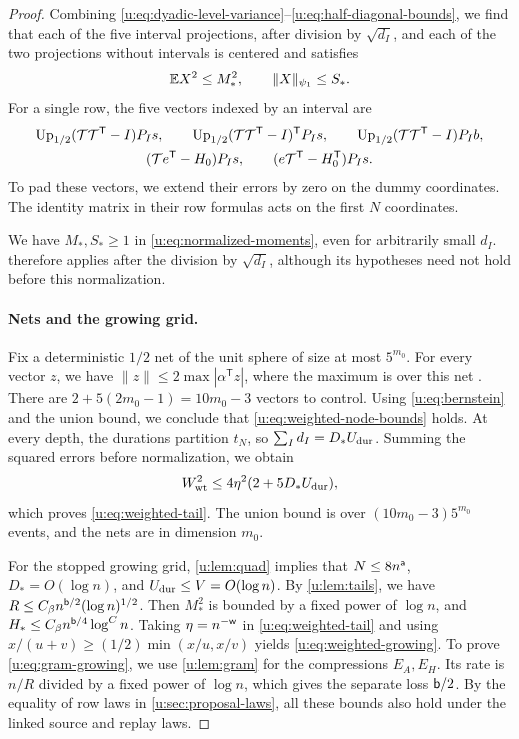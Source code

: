 \begin{proof}
Combining \eqref{u:eq:dyadic-level-variance}--\eqref{u:eq:half-diagonal-bounds},
we find that each of the five interval projections, after division by
$\sqrt{d_I}$, and each of the two projections without intervals is
centered and satisfies
\begin{equation}\label{u:eq:normalized-moments}
 \mathbb E X^2\le M_*^2,\qquad \|X\|_{\psi_1}\le S_*.
\end{equation}
For a single row, the five vectors indexed by an interval are
\[
\begin{gathered}
 \operatorname{Up}_{1/2}(\mathcal T\mathcal T^{\mathsf T}-I)P_Is,\qquad
 \operatorname{Up}_{1/2}(\mathcal T\mathcal T^{\mathsf T}-I)^{\mathsf T}P_Is,\qquad
 \operatorname{Up}_{1/2}(\mathcal T\mathcal T^{\mathsf T}-I)P_Ib,\\
 (\mathcal T e^{\mathsf T}-H_0)P_Is,\qquad
 (e\mathcal T^{\mathsf T}-H_0^{\mathsf T})P_Is.
\end{gathered}
\]
To pad these vectors, we extend their errors by zero on the dummy
coordinates. The identity matrix in their row formulas acts on the
first $N$ coordinates.

We have $M_*,S_*\ge1$ in \eqref{u:eq:normalized-moments}, even
for arbitrarily small $d_I$.  therefore applies
after the division by $\sqrt{d_I}$, although its hypotheses need not hold
before this normalization.

\paragraph{Nets and the growing grid.}
Fix a deterministic $1/2$ net of the unit sphere of size at most
$5^{m_0}$. For every vector $z$, we have
$\|z\|\le2\max|\alpha^{\mathsf T}z|$, where the maximum is over
this net \cite[Corollary~4.2.13 and Exercise~4.4.2]{vershynin-2018}.
There are $2+5(2m_0-1)=10m_0-3$ vectors to control.
Using \eqref{u:eq:bernstein} and the union bound, we conclude that
\eqref{u:eq:weighted-node-bounds} holds. At every depth, the durations
partition $t_N$, so $\sum_Id_I=D_*U_{\rm dur}$. Summing the squared
errors before normalization, we obtain
\[
 W_{\rm wt}^2\le4\eta^2(2+5D_*U_{\rm dur}),
\]
which proves \eqref{u:eq:weighted-tail}. The union bound is over
$(10m_0-3)5^{m_0}$ events, and the nets are in dimension $m_0$.

For the stopped growing grid, \cref{u:lem:quad} implies that
$N\le8n^{\mathsf{a}}$, $D_*=O(\log n)$, and
$U_{\rm dur}\le V=O(\log n)$. By \cref{u:lem:tails}, we have
$R\le C_\beta n^{\mathsf{b}/2}(\log n)^{1/2}$. Then
$M_*^2$ is bounded by a fixed power of $\log n$, and
$H_*\le C_\beta n^{\mathsf{b}/4}\log^C n$.
Taking $\eta=n^{-\mathsf{w}}$ in \eqref{u:eq:weighted-tail} and using
$x/(u+v)\ge(1/2)\min(x/u,x/v)$ yields
\eqref{u:eq:weighted-growing}.
To prove \eqref{u:eq:gram-growing}, we use \cref{u:lem:gram} for the
compressions $E_A,E_H$. Its rate is $n/R$ divided by a fixed power of
$\log n$, which gives the separate loss $\mathsf{b}/2$.
By the equality of row laws in \cref{u:sec:proposal-laws}, all these
bounds also hold under the linked source and replay laws.
\end{proof}

